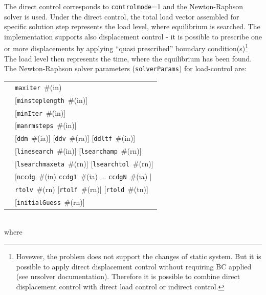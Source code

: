 \documentclass[a4paper]{article}
\makeatletter
\newcommand{\param}[1]{\texttt{#1}} %
\newcommand{\optional}[1]{[#1]} %
\newcommand{\field}[2]{\param{#1}~\#{\tiny(#2)}} %
\newcommand{\optField}[2]{\optional{\field{#1}{#2}}}
\newenvironment{record}[1][]{\begin{tabular}{|ll}}{\end{tabular}\\}
\newcommand{\recentry}[2]{{#1}&{#2}\\}
\newcounter{rcc}
\newenvironment{record}[1][\textwidth]{\setcounter{rcc}{0}\begin{tabular*}{#1}{|ll@{\extracolsep{\fill}}r}}{\end{tabular*}\\}
\newcommand{\recentry}[2]{\ifthenelse{\value{rcc}>0}{&$\backslash$ \\}{\setcounter{rcc}{1}}{#1}&{#2}}
\makeatother
\begin{document}
The direct control corresponds to \param{controlmode}=1 and the Newton-Raphson solver is used.
Under the direct control, the total load
vector assembled for specific solution step represents the load level,
where equilibrium is searched. The implementation supports also
displacement control -  it is possible to prescribe one or more
displacements by applying ``quasi prescribed'' boundary
condition(s)\footnote{Hovewer, the problem does not support the
changes of static system. But it is possible to apply direct
displacement control without requiring BC applied (see nrsolver
documentation). Therefore it is possible to combine
direct displacement control with direct load control or indirect
control.}
The load level then represents the
time, where the equilibrium has been found. The Newton-Raphson solver parameters (\param{solverParams}) for
load-control are:\\
\begin{record}
  \recentry{\hspace{10mm}}{\field{maxiter}{in}}
  \recentry{}{\optField{minsteplength}{in}}
  \recentry{}{\optField{minIter}{in}}
  \recentry{}{\optField{manrmsteps}{in}}
  \recentry{}{\optField{ddm}{ia} \optField{ddv}{ra} \optField{ddltf}{in}}
  \recentry{}{\optField{linesearch}{in} \optField{lsearchamp}{rn}}
  \recentry{}{\optField{lsearchmaxeta}{rn} \optField{lsearchtol}{rn}}
  \recentry{}{\optional{\field{nccdg}{in} \field{ccdg1}{ia} ... \field{ccdgN}{ia}  }}
  \recentry{}{\field{rtolv}{rn} \optField{rtolf}{rn} \optField{rtold}{tn}}
  \recentry{}{\optField{initialGuess}{rn}}
\end{record}
where
\end{document}
